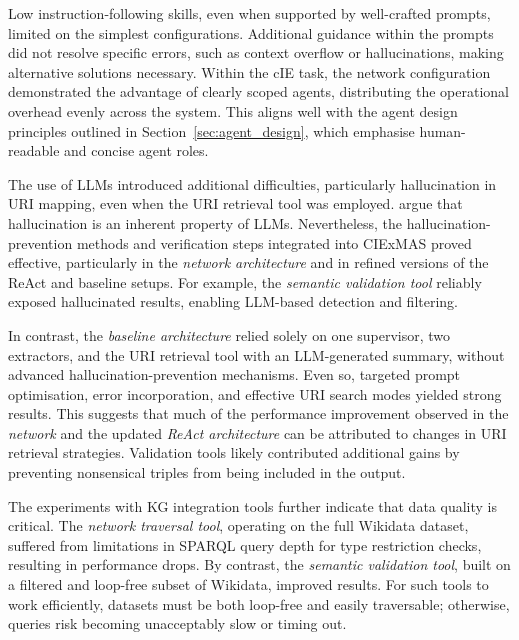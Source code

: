 \documentclass[a4paper,oneside,bibliography=totoc]{scrbook}
\begin{document}
Low instruction-following skills, even when supported by well-crafted prompts, limited on the simplest configurations. Additional guidance within the prompts did not resolve specific errors, such as context overflow or hallucinations, making alternative solutions necessary. Within the \ac{cIE} task, the network configuration demonstrated the advantage of clearly scoped agents, distributing the operational overhead evenly across the system. This aligns well with the agent design principles outlined in Section~\ref{sec:agent_design}, which emphasise human-readable and concise agent roles.

The use of \acp{LLM} introduced additional difficulties, particularly hallucination in \ac{URI} mapping, even when the \ac{URI} retrieval tool was employed. \citet{Xu2025} argue that hallucination is an inherent property of \acp{LLM}. Nevertheless, the hallucination-prevention methods and verification steps integrated into CIExMAS proved effective, particularly in the \textit{network architecture} and in refined versions of the \ac{ReAct} and baseline setups. For example, the \textit{semantic validation tool} reliably exposed hallucinated results, enabling \ac{LLM}-based detection and filtering.

In contrast, the \textit{baseline architecture} relied solely on one supervisor, two extractors, and the \ac{URI} retrieval tool with an \ac{LLM}-generated summary, without advanced hallucination-prevention mechanisms. Even so, targeted prompt optimisation, error incorporation, and effective \ac{URI} search modes yielded strong results. This suggests that much of the performance improvement observed in the \textit{network} and the updated \textit{\ac{ReAct} architecture} can be attributed to changes in \ac{URI} retrieval strategies. Validation tools likely contributed additional gains by preventing nonsensical triples from being included in the output. \pagebreak[4]

The experiments with \ac{KG} integration tools further indicate that data quality is critical. The \textit{network traversal tool}, operating on the full Wikidata dataset, suffered from limitations in \ac{SPARQL} query depth for type restriction checks, resulting in performance drops. By contrast, the \textit{semantic validation tool}, built on a filtered and loop-free subset of Wikidata, improved results. For such tools to work efficiently, datasets must be both loop-free and easily traversable; otherwise, queries risk becoming unacceptably slow or timing out.
\end{document}

